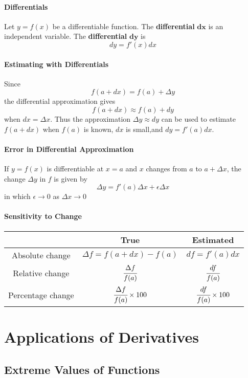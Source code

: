 \documentclass{article}
\begin{document}
            \paragraph{Differentials} Let $y=f(x)$ be a differentiable function. The \textbf{differential} $\bm{dx}$ is an independent variable. The \textbf{differential} $\bm{dy}$ is
            \[dy=f'(x)dx\]
            \paragraph{Estimating with Differentials}
            Since
            \[f(a+dx)=f(a)+\Delta y\]
            the differential approximation gives
            \[f(a+dx)\approx f(a)+dy\]
            when $dx=\Delta x$. Thus the approximation $\Delta y \approx dy$ can be used to estimate $f(a+dx)$ when $f(a)$ is known, $dx$ is small,and $dy=f'(a)dx$.
            \paragraph{Error in Differential Approximation}
            If $y=f(x)$ is differentiable at $x=a$ and $x$ changes from $a$ to $a+\Delta x$, the change $\Delta y$ in $f$ is given by 
            \[\Delta y=f'(a) \Delta x+\epsilon\Delta x\]
            in which $\epsilon\to 0$ as $\Delta x\to 0$\\

            \paragraph{Sensitivity to Change}
            \begin{tabular}{ccc}
                \hline
                &\textbf{True}&\textbf{Estimated}\\
                \hline
                Absolute change & $\Delta f=f(a+dx)-f(a)$ & $df=f'(a)dx$\\
                Relative change&$\cfrac{\Delta f}{f(a)}$&$\cfrac{df}{f(a)}$\\
                Percentage change&$\cfrac{\Delta f}{f(a)}\times 100$&$\cfrac{df}{f(a)}\times 100$\\
            \end{tabular}

    \newpage
    \section{Applications of Derivatives}
        \subsection{Extreme Values of Functions}
\end{document}
